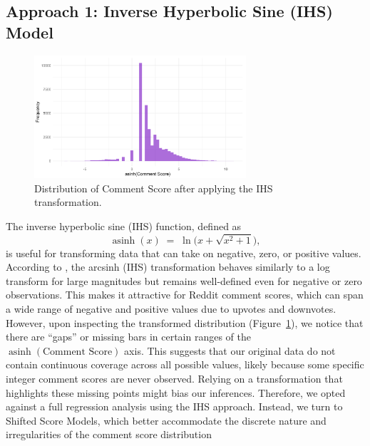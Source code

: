 \documentclass[10pt]{article}
\begin{document}
\subsection{Approach 1: Inverse Hyperbolic Sine (IHS) Model}
\begin{figure}[H]
    \centering
    \includegraphics[width=0.7\textwidth]{pictures/ihs_distribution.png}
    \caption{Distribution of Comment Score after applying the IHS transformation.}
    \label{fig:ihs-distribution}
\end{figure}

The inverse hyperbolic sine (IHS) function, defined as
\[
    \operatorname{asinh}(x) \;=\; \ln\!\bigl(x + \sqrt{x^2 + 1}\bigr),
\]
is useful for transforming data that can take on negative, zero, or positive values. According to \citet{burbidge1988}, the arcsinh (IHS) transformation behaves similarly to a log transform for large magnitudes but remains well-defined even for negative or zero observations. This makes it attractive for Reddit comment scores, which can span a wide range of negative and positive values due to upvotes and downvotes. \\

\noindent However, upon inspecting the transformed distribution (Figure~\ref{fig:ihs-distribution}), we notice that there are “gaps” or missing bars in certain ranges of the \(\operatorname{asinh}(\text{Comment Score})\) axis. This suggests that our original data do not contain continuous coverage across all possible values, likely because some specific integer comment scores are never observed. Relying on a transformation that highlights these missing points might bias our inferences. Therefore, we opted against a full regression analysis using the IHS approach. Instead, we turn to Shifted Score Models, which better accommodate the discrete nature and irregularities of the comment score distribution

\end{document}
